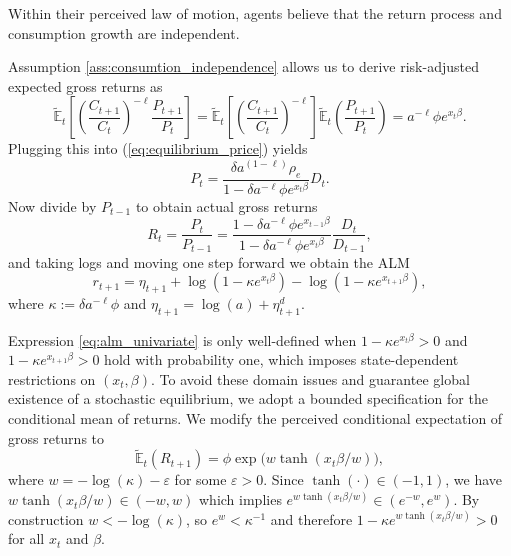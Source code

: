 \documentclass[11pt]{article}
\begin{document}
\begin{assumption}\label{ass:consumtion_independence}
    Within their perceived law of motion, agents believe that the return process and consumption growth are independent.
\end{assumption}
Assumption \ref{ass:consumtion_independence} allows us to derive risk-adjusted expected gross returns as
\begin{equation}
    \tilde{\mathbb{E}}_t \left[\left( \frac{C_{t+1}}{C_t}\right)^{- \ell} \frac{P_{t+1}}{P_t} \right] = \tilde{\mathbb{E}}_t \left[\left( \frac{C_{t+1}}{C_t}\right)^{- \ell} \right] \tilde{\mathbb{E}}_t\left(\frac{P_{t+1}}{P_t}\right) = a ^ {-\ell} \phi e^{x_t \beta}.
\end{equation}
Plugging this into (\ref{eq:equilibrium_price}) yields
\begin{equation}
    P_t = \frac{\delta a^{(1 - \ell)} \rho_e}{1 - \delta a^{- \ell} \phi e^{x_t \beta}} D_t.
\end{equation} 
Now divide by $P_{t-1}$ to obtain actual gross returns
\begin{equation}
    R_{t} = \frac{P_{t}}{P_{t-1}} = \frac{1 - \delta a^{- \ell} \phi e^{x_{t-1} \beta}}{1 - \delta a^{- \ell} \phi e^{x_{t} \beta}} \frac{D_t}{D_{t-1}},
\end{equation}
and taking logs and moving one step forward we obtain the ALM 
\begin{equation}\label{eq:alm_univariate}
    r_{t+1} = \eta_{t+1} + \log(1 - \kappa e^{x_{t} \beta}) - \log(1 - \kappa e^{x_{t+1} \beta}),
\end{equation}
where $\kappa := \delta a^{- \ell} \phi$ and $\eta_{t+1} = \log(a) + \eta^d_{t+1}$.

Expression \eqref{eq:alm_univariate} is only well-defined when $1 - \kappa e^{x_t \beta} > 0$ and $1 - \kappa e^{x_{t+1} \beta} > 0$ hold with probability one, which imposes state-dependent restrictions on $(x_t,\beta)$. To avoid these domain issues and guarantee global existence of a stochastic equilibrium, we adopt a bounded specification for the conditional mean of returns. We modify the perceived conditional expectation of gross returns to
\begin{equation}
    \tilde{\mathbb{E}}_t(R_{t+1}) = \phi \exp\bigl( w \tanh(x_t \beta / w) \bigr),
\end{equation}
where $w = -\log(\kappa) - \varepsilon$ for some $\varepsilon > 0$. Since $\tanh(\cdot) \in (-1,1)$, we have $w \tanh(x_t \beta / w) \in (-w,w)$ which implies $e^{w \tanh(x_t \beta / w)} \in (e^{-w}, e^{w})$. By construction $w < -\log(\kappa)$, so $e^{w} < \kappa^{-1}$ and therefore $1 - \kappa e^{w \tanh(x_t \beta / w)} > 0$ for all $x_t$ and $\beta$.
\end{document}
